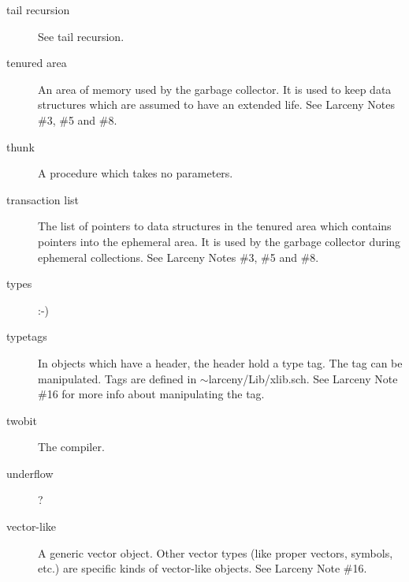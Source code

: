 \begin{description}
\item[tail recursion]  
See tail recursion.

\item[tenured area]
An area of memory used by the garbage collector.  It is used to keep
data structures which are assumed to have an extended life.
See Larceny Notes \#3, \#5 and \#8.

\item[thunk]
A procedure which takes no parameters.

\item[transaction list]
The list of pointers to data structures in the tenured area which contains
pointers into the ephemeral area.  It is used by the garbage collector 
during ephemeral collections.
See Larceny Notes \#3, \#5 and \#8.

\item[types]
:-)

\item[typetags]
In objects which have a header, the header hold a type tag.  The tag
can be manipulated.  Tags are defined in $\sim$larceny/Lib/xlib.sch.
See Larceny Note \#16 for more info about manipulating the tag.

\item[twobit]
The compiler.  

\item[underflow]
?

\item[vector-like]
A generic vector object.  Other vector types (like proper vectors, symbols,
etc.) are specific kinds of vector-like objects.
See Larceny Note \#16.

\end{description}

